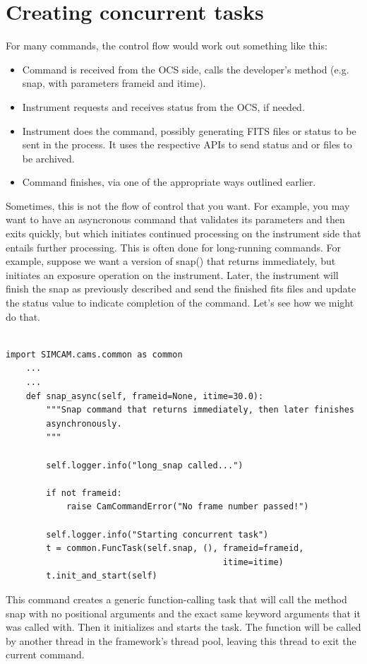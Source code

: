 \documentclass[11pt]{report}
\begin{document}
\section{Creating concurrent tasks}
For many commands, the control flow would work out something like this:
\begin{itemize}
\item Command is received from the OCS side, calls the developer's method
      (e.g. snap, with parameters frameid and itime). 

\item Instrument requests and receives status from the OCS, if needed.

\item Instrument does the command, possibly generating FITS files or
    status to be sent in the process. It uses the respective APIs to
    send status and or files to be archived. 

\item Command finishes, via one of the appropriate ways outlined earlier.
\end{itemize}
Sometimes, this is not the flow of control that you want. For example,
you may want to have an asyncronous command that validates its
parameters and then exits quickly, but which initiates continued
processing on the instrument side that entails further processing. This
is often done for long-running commands. For example, suppose we want a
version of snap() that returns immediately, but initiates an exposure
operation on the instrument. Later, the instrument will finish the snap
as previously described and send the finished fits files and update the
status value to indicate completion of the command. Let's see how we
might do that. 
\begin{verbatim}

import SIMCAM.cams.common as common
    ...
    ...
    def snap_async(self, frameid=None, itime=30.0):
        """Snap command that returns immediately, then later finishes
        asynchronously.
        """

        self.logger.info("long_snap called...")

        if not frameid:
            raise CamCommandError("No frame number passed!")

        self.logger.info("Starting concurrent task")
        t = common.FuncTask(self.snap, (), frameid=frameid,
                                           itime=itime)
        t.init_and_start(self)

\end{verbatim}
This command creates a generic function-calling task that will call the
method snap with no positional arguments and the exact same keyword
arguments that it was called with. Then it initializes and starts the
task. The function will be called by another thread in the framework's
thread pool, leaving this thread to exit the current command. 
\end{document}

